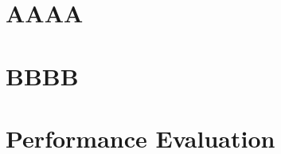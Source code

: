 \documentclass[a4paper, 12pt, oneside, BCOR1cm,toc=chapterentrywithdots]{scrbook}
\begin{document}
\begin{appendices}

\chapter{AAAA}

\chapter{BBBB}

\chapter{Performance Evaluation}

			
\end{appendices}
\end{document}
